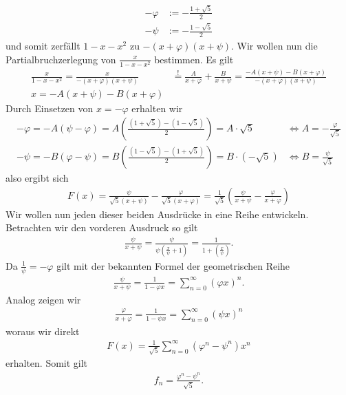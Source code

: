 \documentclass[a4paper,11pt]{article}
\theoremstyle{mytheor}
\begin{document}
\begin{align*}
    -\varphi & := -\frac{1+\sqrt{5}}{2} \\
    -\psi    & := -\frac{1-\sqrt{5}}{2}
\end{align*}
und somit zerfällt $1-x-x^2$ zu $-(x+\varphi)(x+\psi)$. Wir wollen nun die Partialbruchzerlegung von $\frac{x}{1-x-x^2}$ bestimmen. Es gilt
\begin{align*}
    \frac{x}{1-x-x^2} = \frac{x}{-(x+\varphi)(x+\psi)} & \overset{!}{=} \frac{A}{x+\varphi} + \frac{B}{x+\psi} = \frac{-A(x+\psi) - B(x+\varphi)}{-(x+\varphi)(x+\psi)} \\
    x = - A(x+\psi) - B(x+\varphi)
\end{align*}
Durch Einsetzen von $x=-\varphi$ erhalten wir
\begin{align*}
    -\varphi=-A(\psi - \varphi) = A \left(\frac{(1 + \sqrt{5}) - (1-\sqrt{5})}{2} \right) = A \cdot \sqrt{5} & \iff A = -\frac{\varphi}{\sqrt{5}} \\
    -\psi=-B(\varphi - \psi) = B \left(\frac{(1-\sqrt{5}) - (1 + \sqrt{5})}{2} \right) = B \cdot (-\sqrt{5}) & \iff B = \frac{\psi}{\sqrt{5}}
\end{align*}
also ergibt sich
\begin{align*}
    F(x) = \frac{\psi}{\sqrt{5} (x+\psi)} - \frac{\varphi}{\sqrt{5} (x+\varphi)} = \frac{1}{\sqrt{5}} \left( \frac{\psi}{x+\psi} - \frac{\varphi}{x+\varphi} \right)
\end{align*}
Wir wollen nun jeden dieser beiden Ausdrücke in eine Reihe entwickeln. Betrachten wir den vorderen Ausdruck so gilt
\begin{align*}
    \frac{\psi}{x+\psi} = \frac{\psi}{\psi(\frac{x}{\psi} + 1)} = \frac{1}{1+(\frac{x}{\psi})}.
\end{align*}
Da $\frac{1}{\psi} = -\varphi$ gilt mit der bekannten Formel der geometrischen Reihe
\begin{align*}
    \frac{\psi}{x+\psi} = \frac{1}{1-\varphi x} = \sum_{n=0}^\infty (\varphi x)^n.
\end{align*}
Analog zeigen wir
\begin{align*}
    \frac{\varphi}{x+\varphi} = \frac{1}{1-\psi x} = \sum_{n=0}^\infty (\psi x)^n
\end{align*}
woraus wir direkt
\begin{align*}
    F(x) = \frac{1}{\sqrt{5}} \sum_{n=0}^\infty (\varphi^n - \psi^n) x^n
\end{align*}
erhalten.
Somit gilt
\begin{align*}
    f_n = \frac{\varphi^n - \psi^n}{\sqrt{5}}.
\end{align*}
\end{document}
